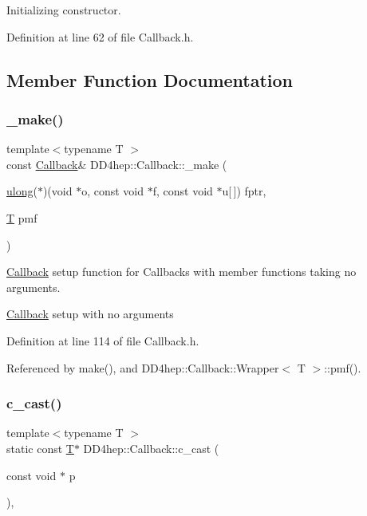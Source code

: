 Initializing constructor. 



Definition at line 62 of file Callback.\+h.



\subsection{Member Function Documentation}
\hypertarget{class_d_d4hep_1_1_callback_ab64f1022925b766ce1b4b190bb486110}{}\label{class_d_d4hep_1_1_callback_ab64f1022925b766ce1b4b190bb486110} 
\subsubsection{\texorpdfstring{\+\_\+make()}{\_make()}}
{\footnotesize\ttfamily template$<$typename T $>$ \\
const \hyperlink{class_d_d4hep_1_1_callback}{Callback}\& D\+D4hep\+::\+Callback\+::\+\_\+make (\begin{DoxyParamCaption}\item[{\hyperlink{class_d_d4hep_1_1_callback_ac676aa0685e2ba51bac69c33f8066431}{ulong}($\ast$)(void $\ast$o, const void $\ast$f, const void $\ast$u\mbox{[}$\,$\mbox{]})}]{fptr,  }\item[{\hyperlink{class_t}{T}}]{pmf }\end{DoxyParamCaption})\hspace{0.3cm}{\ttfamily [inline]}}



\hyperlink{class_d_d4hep_1_1_callback}{Callback} setup function for Callbacks with member functions taking no arguments. 

\hyperlink{class_d_d4hep_1_1_callback}{Callback} setup with no arguments 

Definition at line 114 of file Callback.\+h.



Referenced by make(), and D\+D4hep\+::\+Callback\+::\+Wrapper$<$ T $>$\+::pmf().

\hypertarget{class_d_d4hep_1_1_callback_af36d4cfe3679ddb677a6cc92bae5c159}{}\label{class_d_d4hep_1_1_callback_af36d4cfe3679ddb677a6cc92bae5c159} 
\subsubsection{\texorpdfstring{c\+\_\+cast()}{c\_cast()}}
{\footnotesize\ttfamily template$<$typename T $>$ \\
static const \hyperlink{class_t}{T}$\ast$ D\+D4hep\+::\+Callback\+::c\+\_\+cast (\begin{DoxyParamCaption}\item[{const void $\ast$}]{p }\end{DoxyParamCaption})\hspace{0.3cm}{\ttfamily [inline]}, {\ttfamily [static]}}




